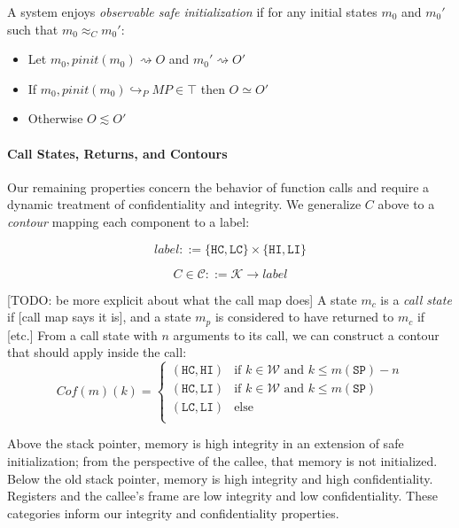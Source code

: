 \documentclass{article}
\begin{document}
      A system enjoys {\it observable safe initialization} if for any initial states \(m_0\)
      and \(m_0'\) such that \(m_0 \approx_C m_0'\):

      \begin{itemize}
        \item Let \(m_0,\mathit{pinit}(m_0) \rightsquigarrow O\) and \(m_0' \rightsquigarrow O'\)
        \item If \(m_0,\mathit{pinit}(m_0) \hookrightarrow_P MP \in \top\) then \(O \simeq O'\)
        \item Otherwise \(O \lesssim O'\)
      \end{itemize}

    \paragraph{Call States, Returns, and Contours}

      Our remaining properties concern the behavior of function calls and require a dynamic treatment
      of confidentiality and integrity. We generalize \(C\) above to a {\it contour} mapping each component
      to a label:

      \[\mathit{label} ::= \{\mathtt{HC},\mathtt{LC}\} \times \{\mathtt{HI},\mathtt{LI}\}\]

      \[C \in \mathcal{C} ::= \mathcal{K} \rightarrow \mathit{label}\]

      [TODO: be more explicit about what the call map does]
      A state \(m_c\) is a {\it call state} if [call map says it is], and a state \(m_p\) is
      considered to have returned to \(m_c\) if [etc.] From a call state with \(n\) arguments to
      its call, we can construct a contour that should apply inside the call:
      \[Cof(m)(k) =
      \begin{cases}
        (\mathtt{HC},\mathtt{HI}) & \text{if } k \in \mathcal{W}
                                    \text{ and } k \leq m(\mathtt{SP}) - n \\
        (\mathtt{HC},\mathtt{LI}) & \text{if } k \in \mathcal{W}
                                    \text{ and } k \leq m(\mathtt{SP}) \\
        (\mathtt{LC},\mathtt{LI}) & \text{else} \\
      \end{cases}\]

      Above the stack pointer, memory is high integrity in an extension of safe initialization;
      from the perspective of the callee, that memory is not initialized. Below the old stack
      pointer, memory is high integrity and high confidentiality. Registers and the callee's
      frame are low integrity and low confidentiality. These categories inform our integrity
      and confidentiality properties.
\end{document}
